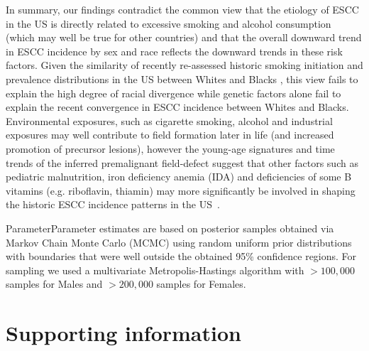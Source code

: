 \documentclass[10pt,letterpaper]{article}
\begin{document}
In summary, our findings contradict the common view that the etiology of ESCC in the US is directly related to excessive smoking and alcohol consumption (which may well be true for other countries) and that the overall downward trend in ESCC incidence by sex and race reflects the downward trends in these risk factors. Given the similarity of recently re-assessed historic smoking initiation and prevalence distributions in the US between Whites and Blacks \cite{Holford2016}, this view fails to explain the high degree of racial divergence while genetic factors alone fail to explain the recent convergence in ESCC incidence between Whites and Blacks. Environmental exposures, such as cigarette smoking, alcohol and industrial exposures may well contribute to field formation later in life (and increased promotion of precursor lesions), however the young-age signatures and time trends of the inferred premalignant field-defect suggest that other factors such as pediatric malnutrition, iron deficiency anemia (IDA) and deficiencies of some B vitamins (e.g. riboflavin, thiamin) may more significantly be involved in shaping the historic ESCC incidence patterns in the US~\cite{Taylor2013,Abnet2018}. 


\newpage
\noindent
ParameterParameter estimates are based on posterior samples obtained via Markov Chain Monte Carlo (MCMC) using random uniform prior distributions with boundaries that were well outside the obtained 95\% confidence regions. For sampling we used a multivariate Metropolis-Hastings algorithm with $>100,000$ samples for Males and $>200,000$ samples for Females. 


\newpage

\section*{Supporting information}

\end{document}
